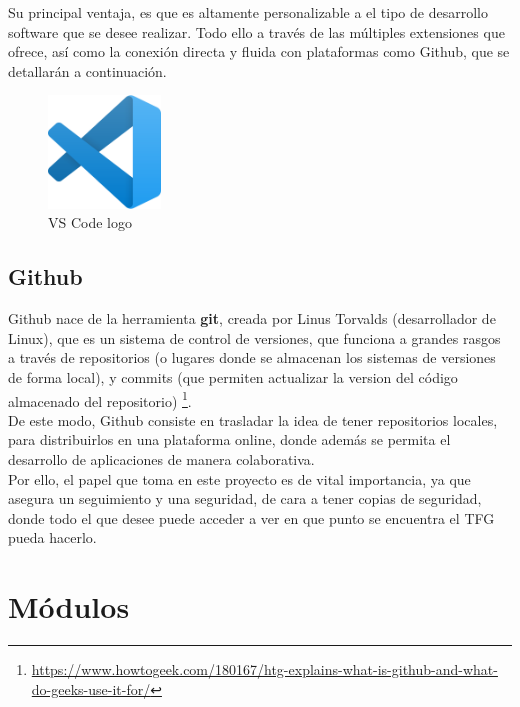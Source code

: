 Su principal ventaja, es que es altamente personalizable a el tipo de desarrollo software que se desee realizar. Todo ello a través de las múltiples extensiones que ofrece, así como la conexión directa y fluida con plataformas como Github, que se detallarán a continuación.\\

\begin{figure} [H]
	\begin{center}
	\includegraphics[height=3cm]{imagenes/cap3/4_vscode_logo.png}
	\end{center}
	\caption[VS Code logo]{VS Code logo}
	\label{fig:vscode}
\end{figure}

\subsection{Github}
\label{subsec:github}

Github nace de la herramienta \textbf{git}, creada por Linus Torvalds (desarrollador de Linux), que es un sistema de control de versiones, que funciona a grandes rasgos a través de repositorios (o lugares donde se almacenan los sistemas de versiones de forma local), y commits (que permiten actualizar la version del código almacenado del repositorio) \footnote[10]{\url{https://www.howtogeek.com/180167/htg-explains-what-is-github-and-what-do-geeks-use-it-for/}}.\\

De este modo, Github consiste en trasladar la idea de tener repositorios locales, para distribuirlos en una plataforma online, donde además se permita el desarrollo de aplicaciones de manera colaborativa.\\

Por ello, el papel que toma en este proyecto es de vital importancia, ya que asegura un seguimiento y una seguridad, de cara a tener copias de seguridad, donde todo el que desee puede acceder a ver en que punto se encuentra el \ac{TFG} pueda hacerlo.\\

\section{Módulos}
\label{sec:modulos}

